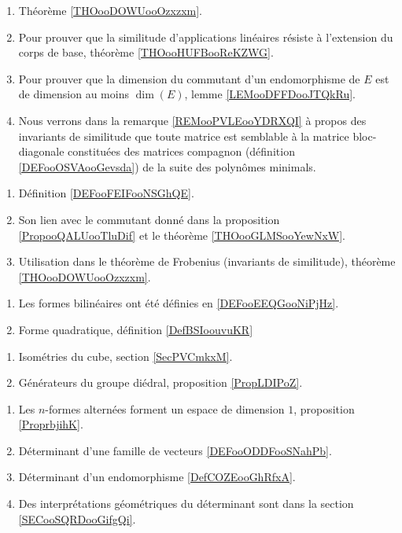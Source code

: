     \begin{enumerate}
        \item
            Théorème \ref{THOooDOWUooOzxzxm}.
        \item
            Pour prouver que la similitude d'applications linéaires résiste à l'extension du corps de base, théorème \ref{THOooHUFBooReKZWG}.
        \item
            Pour prouver que la dimension du commutant d'un endomorphisme de \( E\) est de dimension au moins \( \dim(E)\), lemme \ref{LEMooDFFDooJTQkRu}.
        \item
            Nous verrons dans la remarque \ref{REMooPVLEooYDRXQI} à propos des invariants de similitude que toute matrice est semblable à la matrice bloc-diagonale constituées des matrices compagnon (définition \ref{DEFooOSVAooGevsda}) de la suite des polynômes minimals.
        \end{enumerate}

    \begin{enumerate}
        \item
            Définition \ref{DEFooFEIFooNSGhQE}.
        \item
            Son lien avec le commutant donné dans la proposition \ref{PropooQALUooTluDif} et le théorème \ref{THOooGLMSooYewNxW}.
        \item
            Utilisation dans le théorème de Frobenius (invariants de similitude), théorème \ref{THOooDOWUooOzxzxm}.
        \end{enumerate}

    \begin{enumerate}
\item
    Les formes bilinéaires ont été définies en \ref{DEFooEEQGooNiPjHz}.
\item
    Forme quadratique, définition \ref{DefBSIoouvuKR}
\end{enumerate}

\begin{enumerate}
    \item Isométries du cube, section \ref{SecPVCmkxM}.
    \item Générateurs du groupe diédral, proposition \ref{PropLDIPoZ}.
\end{enumerate}

    \begin{enumerate}
    \item
        Les \( n\)-formes alternées forment un espace de dimension \( 1\), proposition \ref{ProprbjihK}.
    \item
        Déterminant d'une famille de vecteurs \ref{DEFooODDFooSNahPb}.
    \item
        Déterminant d'un endomorphisme \ref{DefCOZEooGhRfxA}.
        \item
            Des interprétations géométriques du déterminant sont dans la section \ref{SECooSQRDooGifgQi}.
        \end{enumerate}

